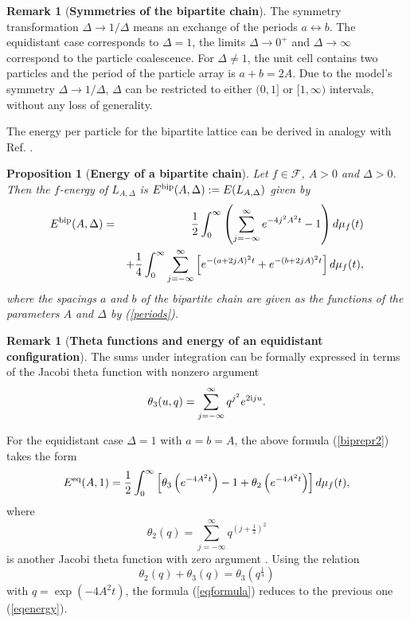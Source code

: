 \documentclass[12pt]{iopart}
\newtheorem{prop}[thm]{Proposition}
\theoremstyle{definition}
\newtheorem{remark}[thm]{Remark}
\begin{document}
\begin{remark}[\textbf{Symmetries of the bipartite chain}]
The symmetry transformation $\Delta\to 1/\Delta$ means an exchange
of the periods $a\leftrightarrow b$.
The equidistant case corresponds to $\Delta=1$, the limits $\Delta\to 0^+$
and $\Delta\to\infty$ correspond to the particle coalescence.
For $\Delta\ne 1$, the unit cell contains two particles and the period
of the particle array is $a+b=2A$.
Due to the model's symmetry $\Delta\to 1/\Delta$, $\Delta$ can be restricted
to either $(0,1]$ or $[1,\infty)$ intervals, without any loss of generality.
\end{remark}

The energy per particle for the bipartite lattice can be derived in analogy
with Ref. \cite{Betermin23b}.

\begin{prop}[\textbf{Energy of a bipartite chain}]
Let $f\in \mathcal{F}$, $A>0$ and $\Delta>0$.
Then the $f$-energy of $L_{A,\Delta}$ is $E^{\rm bip}(A,\Delta):=E(L_{A,\Delta})$
given by
\begin{eqnarray} 
E^{\rm bip}(A,\Delta) & = & \frac{1}{2} \int_0^{\infty} \left(
\sum_{j=-\infty}^{\infty} e^{-4j^2 A^2 t} - 1 \right) d\mu_f(t) \nonumber \\
& & + \frac{1}{4} \int_0^{\infty} \sum_{j=-\infty}^{\infty}
\left[ e^{-(a+2jA)^2 t} + e^{-(b+2jA)^2 t} \right] d\mu_f(t) , \label{biprepr2}
\end{eqnarray}
where the spacings $a$ and $b$ of the bipartite chain are given as
the functions of the parameters $A$ and $\Delta$ by {\rm (\ref{periods})}. 
\end{prop}
\begin{remark}[\textbf{Theta functions and energy of an equidistant configuration}]
The sums under integration can be formally expressed in terms of
the Jacobi theta function with nonzero argument \cite{Gradshteyn}
\begin{equation}
\theta_3(u,q) = \sum_{j=-\infty}^{\infty} q^{j^2} e^{2{\rm i}ju} .
\end{equation}


For the equidistant case $\Delta=1$ with $a=b=A$, the above formula
(\ref{biprepr2}) takes the form
\begin{equation} \label{eqformula} 
E^{\rm eq}(A,1) = \frac{1}{2} \int_0^{\infty} \left[
\theta_3\left( e^{-4 A^2 t}\right) - 1 + \theta_2\left( e^{-4 A^2 t}\right)
\right] d\mu_f(t) ,
\end{equation}
where
\begin{equation}
\theta_2(q) = \sum_{j=-\infty}^{\infty} q^{\left(j+{\scriptstyle\frac{1}{2}}\right)^2}
\end{equation}  
is another Jacobi theta function with zero argument \cite{Gradshteyn}. 
Using the relation
\begin{equation}
\theta_2(q) + \theta_3(q) = \theta_3\left(q^{\scriptstyle\frac{1}{4}} \right)
\end{equation}
with $q=\exp(-4A^2 t)$, the formula (\ref{eqformula})
reduces to the previous one (\ref{eqenergy}). 
\end{remark}
\end{document}
